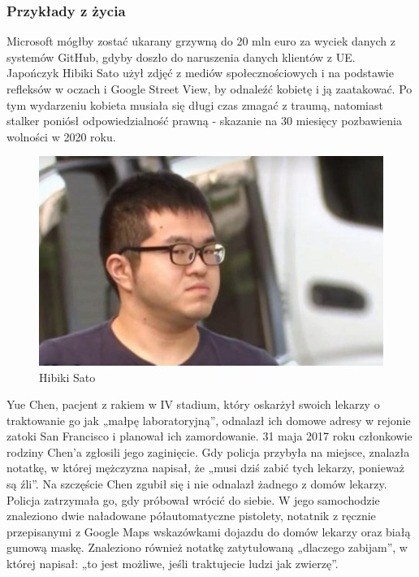 \subsubsection{Przykłady z życia}
Microsoft mógłby zostać ukarany grzywną do 20 mln euro za wyciek danych z systemów GitHub, gdyby doszło do naruszenia danych klientów z UE.\\

Japończyk Hibiki Sato użył zdjęć z mediów społecznościowych i na podstawie refleksów w oczach i Google Street View, by odnaleźć kobietę i ją zaatakować. Po tym wydarzeniu kobieta musiała się długi czas zmagać z traumą, natomiast stalker poniósł odpowiedzialność prawną - skazanie na 30 miesięcy pozbawienia wolności w 2020 roku.
\begin{figure}
  \centering
  \includegraphics[width=1\textwidth]{images/stalker.jpg}
  \caption{Hibiki Sato}
  \label{fig:stalker}
\end{figure}

Yue Chen, pacjent z rakiem w IV stadium, który oskarżył swoich lekarzy o traktowanie go jak „małpę laboratoryjną”, odnalazł ich domowe adresy w rejonie zatoki San Francisco i planował ich zamordowanie.
31 maja 2017 roku członkowie rodziny Chen'a zgłosili jego zaginięcie. Gdy policja przybyła na miejsce, znalazła notatkę, w której mężczyzna napisał, że „musi dziś zabić tych lekarzy, ponieważ są źli”.
Na szczęście Chen zgubił się i nie odnalazł żadnego z domów lekarzy. Policja zatrzymała go, gdy próbował wrócić do siebie. W jego samochodzie znaleziono dwie naładowane półautomatyczne pistolety, notatnik z ręcznie przepisanymi z Google Maps wskazówkami dojazdu do domów lekarzy oraz białą gumową maskę. Znaleziono również notatkę zatytułowaną „dlaczego zabijam”, w której napisał: „to jest możliwe, jeśli traktujecie ludzi jak zwierzę”.